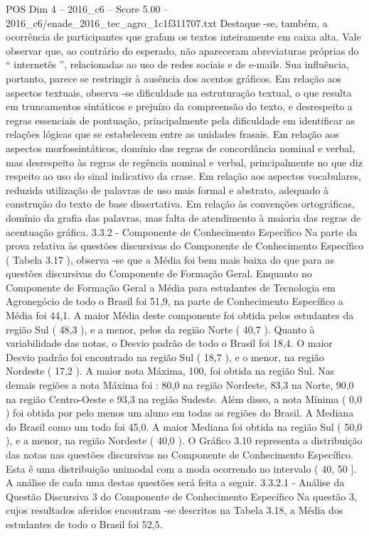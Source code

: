 \begin{textsample}{POS Dim 4 – 2016\_c6 – Score 5.00 – 2016\_c6/enade\_2016\_tec\_agro\_1c1f311707.txt}
Destaque -se, também, a ocorrência de participantes que grafam os textos inteiramente em caixa alta.
Vale observar que, ao contrário do esperado, não apareceram abreviaturas próprias do “ internetês ”, relacionadas ao uso de redes sociais e de e-mails.
Sua influência, portanto, parece se restringir à ausência dos acentos gráficos.
Em relação aos aspectos textuais, observa -se dificuldade na estruturação textual, o que resulta em truncamentos sintáticos e prejuízo da compreensão do texto, e desrespeito a regras essenciais de pontuação, principalmente pela dificuldade em identificar as relações lógicas que se estabelecem entre as unidades frasais.
Em relação aos aspectos morfossintáticos, domínio das regras de concordância nominal e verbal, mas desrespeito às regras de regência nominal e verbal, principalmente no que diz respeito ao uso do sinal indicativo da crase.
Em relação aos aspectos vocabulares, reduzida utilização de palavras de uso mais formal e abstrato, adequado à construção do texto de base dissertativa.
Em relação às convenções ortográficas, domínio da grafia das palavras, mas falta de atendimento à maioria das regras de acentuação gráfica. 3.3.2 - Componente de Conhecimento Específico Na parte da prova relativa às questões discursivas do Componente de Conhecimento Específico ( Tabela 3.17 ), observa -se que a Média foi bem mais baixa do que para as questões discursivas do Componente de Formação Geral.
Enquanto no Componente de Formação Geral a Média para estudantes de Tecnologia em Agronegócio de todo o Brasil foi 51,9, na parte de Conhecimento Específico a Média foi 44,1.
A maior Média deste componente foi obtida pelos estudantes da região Sul ( 48,3 ), e a menor, pelos da região Norte ( 40,7 ).
Quanto à variabilidade das notas, o Desvio padrão de todo o Brasil foi 18,4.
O maior Desvio padrão foi encontrado na região Sul ( 18,7 ), e o menor, na região Nordeste ( 17,2 ).
A maior nota Máxima, 100, foi obtida na região Sul.
Nas demais regiões a nota Máxima foi : 80,0 na região Nordeste, 83,3 na Norte, 90,0 na região Centro-Oeste e 93,3 na região Sudeste.
Além disso, a nota Mínima ( 0,0 ) foi obtida por pelo menos um aluno em todas as regiões do Brasil.
A Mediana do Brasil como um todo foi 45,0.
A maior Mediana foi obtida na região Sul ( 50,0 ), e a menor, na região Nordeste ( 40,0 ).
O Gráfico 3.10 representa a distribuição das notas nas questões discursivas no Componente de Conhecimento Específico.
Esta é uma distribuição unimodal com a moda ocorrendo no intervalo ( 40, 50 ].
A análise de cada uma destas questões será feita a seguir. 3.3.2.1 - Análise da Questão Discursiva 3 do Componente de Conhecimento Específico Na questão 3, cujos resultados aferidos encontram -se descritos na Tabela 3.18, a Média dos estudantes de todo o Brasil foi 52,5.

\end{textsample}
